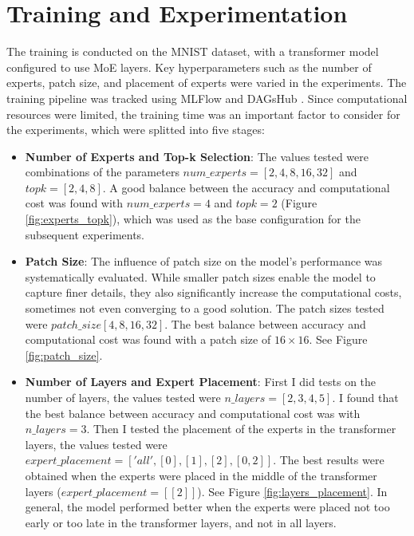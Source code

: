 \documentclass[a4paper,11pt]{article}
\begin{document}
\section{Training and Experimentation}
The training is conducted on the MNIST dataset, with a transformer model configured to use MoE layers. Key hyperparameters such as the number of experts, patch size, and placement of experts were varied in the experiments. The training pipeline was tracked using MLFlow \cite{mlflow} and DAGsHub \cite{dagshub}. Since computational resources were limited, the training time was an important factor to consider for the experiments, which were splitted into five stages:

\begin{itemize}
    \item \textbf{Number of Experts and Top-k Selection}: 
    The values tested were combinations of the parameters $num\_experts = [2, 4, 8, 16, 32]$ and $topk = [2, 4, 8]$. A good balance between the accuracy and computational cost was found with $num\_experts = 4$ and $topk = 2$ (Figure \ref{fig:experts_topk}), which was used as the base configuration for the subsequent experiments.

    
    \item \textbf{Patch Size}: The influence of patch size on the model's performance was systematically evaluated. While smaller patch sizes enable the model to capture finer details, they also significantly increase the computational costs, sometimes not even converging to a good solution. The patch sizes tested were $patch\_size  [4, 8, 16, 32]$. The best balance between accuracy and computational cost was found with a patch size of $16 \times 16$. See Figure \ref{fig:patch_size}.


    \item \textbf{Number of Layers and Expert Placement}: First I did tests on the number of layers, the values tested were $n\_layers = [2, 3, 4, 5]$. I found that the best balance between accuracy and computational cost was with $n\_layers = 3$. Then I tested the placement of the experts in the transformer layers, the values tested were $expert\_placement = ['all', [0], [1], [2], [0, 2]]$. The best results were obtained when the experts were placed in the middle of the transformer layers ($expert\_placement = [[2]]$). See Figure \ref{fig:layers_placement}. In general, the model performed better when the experts were placed not too early or too late in the transformer layers, and not in all layers.


\end{itemize}
\end{document}
